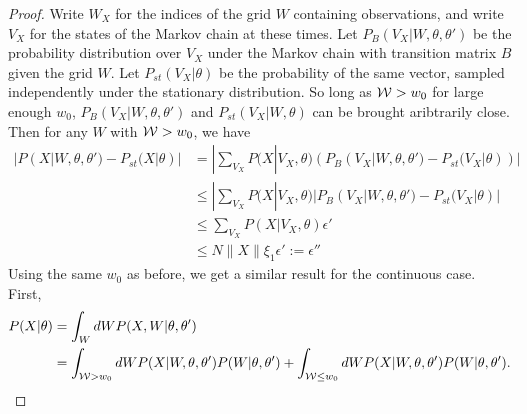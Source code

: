 \begin{proof}
Write $W_X$ for the indices of the grid $W$ containing observations, and write $V_X$
for the states of the Markov chain at these times.
Let $P_B(V_X | W, \theta, \theta')$ be the probability distribution over
$V_X$ under the Markov chain with transition matrix $B$ given the grid $W$.
Let $P_{st}(V_X|\theta)$ be the probability of the same vector, sampled
independently under the stationary distribution. So
long as ${\mathcal W} > w_0$ for large enough $w_0$,
$P_B(V_X | W, \theta, \theta')$ and  $P_{st}(V_X | W, \theta)$ can be
brought aribtrarily close.
Then for any $W$ with ${\mathcal W} > w_0$, we have
\begin{align*}
|P(X|W , \theta, \theta') - P_{st}(X | \theta)| &= | \sum_{V_X} P(X|V_X, \theta)(P_B(V_X | W, \theta, \theta') -  P_{st}(V_X | \theta))|\\
& \leq |\sum_{V_X} P(X | V_X, \theta)|P_B(V_X | W, \theta, \theta') -  P_{st}(V_X | \theta)|\\
& \leq \sum_{V_X} P(X | V_X, \theta){\epsilon'}\\
& \leq N \parallel X \parallel \xi_1\epsilon' := \epsilon''
\end{align*}
Using the same $w_0$ as before, we get a similar result for the
continuous case. First,
\begin{align*}
P(X | \theta) &= \int_W dW P(X , W | \theta, \theta')\\
&= \int_{\mW > w_0} dW P(X | W, \theta, \theta') P(W | \theta, \theta') + \int_{\mW \leq w_0}dW P(X | W, \theta, \theta') P(W | \theta, \theta').

\end{align*}
\end{proof}
